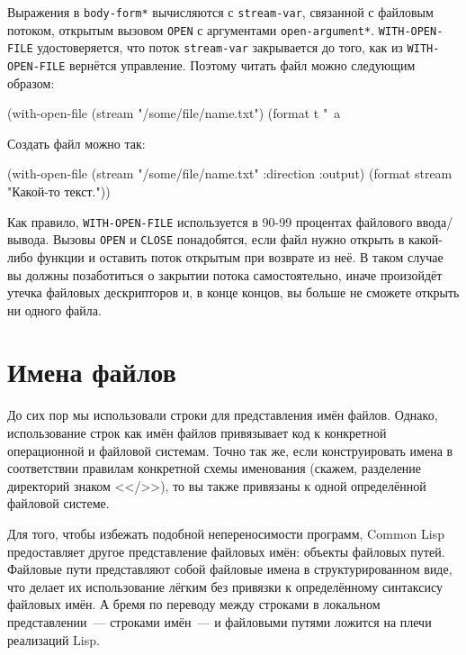 Выражения в \lstinline{body-form*} вычисляются с \lstinline{stream-var}, связанной с файловым
потоком, открытым вызовом \lstinline{OPEN} с аргументами
\lstinline{open-argument*}. \lstinline{WITH-OPEN-FILE} удостоверяется, что поток \lstinline{stream-var}
закрывается до того, как из \lstinline{WITH-OPEN-FILE} вернётся управление. Поэтому читать файл
можно следующим образом:

\begin{myverb}
(with-open-file (stream "/some/file/name.txt") 
  (format t "~a~%
\end{myverb}

Создать файл можно так:

\begin{myverb}
(with-open-file (stream "/some/file/name.txt" :direction :output) 
  (format stream "Какой-то текст.")) 
\end{myverb}

Как правило, \lstinline{WITH-OPEN-FILE} используется в 90-99 процентах файлового
ввода/вывода. Вызовы \lstinline{OPEN} и \lstinline{CLOSE} понадобятся, если файл нужно открыть в
какой-либо функции и оставить поток открытым при возврате из неё. В таком случае вы должны
позаботиться о закрытии потока самостоятельно, иначе произойдёт утечка файловых
дескрипторов и, в конце концов, вы больше не сможете открыть ни одного файла.

\section{Имена файлов}

До сих пор мы использовали строки для представления имён файлов. Однако, использование
строк как имён файлов привязывает код к конкретной операционной и файловой системам. Точно
так же, если конструировать имена в соответствии правилам конкретной схемы именования
(скажем, разделение директорий знаком <</>>), то вы также привязаны к одной определённой
файловой системе.

Для того, чтобы избежать подобной непереносимости программ, Common Lisp предоставляет
другое представление файловых имён: объекты файловых путей. Файловые пути представляют
собой файловые имена в структурированном виде, что делает их использование лёгким без
привязки к определённому синтаксису файловых имён. А бремя по переводу между строками в
локальном представлении~--- строками имён~--- и файловыми путями ложится на плечи реализаций
Lisp.

